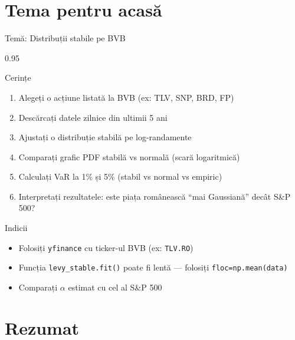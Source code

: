 \documentclass[9pt, aspectratio=169, t]{beamer}
\begin{document}
\section{Tema pentru acasă}

\begin{frame}{Temă: Distribuții stabile pe BVB}
    \begin{cminipage}{0.95\textwidth}
\begin{block}{Cerințe}
\begin{enumerate}\setlength{\itemsep}{0pt}
    \item Alegeți o acțiune listată la BVB (ex: TLV, SNP, BRD, FP)
    \item Descărcați datele zilnice din ultimii 5 ani
    \item Ajustați o distribuție stabilă pe log-randamente
    \item Comparați grafic PDF stabilă vs normală (scară logaritmică)
    \item Calculați VaR la 1\% și 5\% (stabil vs normal vs empiric)
    \item Interpretați rezultatele: este piața românească ``mai Gaussiană'' decât S\&P 500?
\end{enumerate}
\end{block}

\vspace{0.2cm}
\begin{exampleblock}{Indicii}
\begin{itemize}\setlength{\itemsep}{0pt}
    \item Folosiți \texttt{yfinance} cu ticker-ul BVB (ex: \texttt{TLV.RO})
    \item Funcția \texttt{levy\_stable.fit()} poate fi lentă --- folosiți \texttt{floc=np.mean(data)}
    \item Comparați $\alpha$ estimat cu cel al S\&P 500
\end{itemize}
\end{exampleblock}
    \end{cminipage}
\end{frame}

\section{Rezumat}
\end{document}
